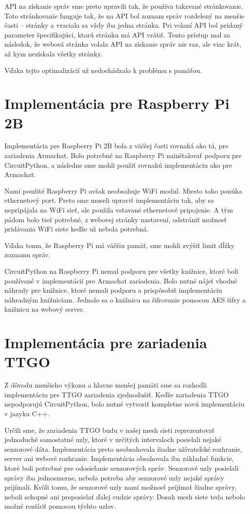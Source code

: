 \documentclass[slovak,master]{diploma}
\begin{document}
API na získanie správ sme preto upravili tak, že používa takzvané stránkovanie. Toto stránkovanie funguje tak, že na API bol zoznam správ rozdelený na menšie časti -- stránky a 
vraciala sa vždy iba jedna stránka. Pri volaní API bol pridaný parameter špecifikujúci, ktorú stránku má API vrátiť. Tento prístup mal za následok, že 
webová stránka volala API na získanie správ nie raz, ale viac krát, až kym nezískala všetky stránky.

Vďaka tejto optimalizácií už nedochádzalo k problému s pamäťou.

\section{Implementácia pre Raspberry Pi 2B}
Implementácia pre Raspberry Pi 2B bola z väčšej časti rovnaká ako tá, pre zariadenia Armachat. Bolo potrebné na Raspberry Pi nainštalovať podporu pre 
CircuitPython, a následne sme mohli použiť rovnakú implementáciu ako pre Armachat.

Nami použité Raspberry Pi avšak neobsahuje WiFi modul. Miesto toho ponúka ethernetový port. Preto sme museli upraviť implementáciu tak, 
aby sa nepripájala na WiFi sieť, ale použila vstavané ethernetové pripojenie. A tým pádom bolo tiež potrebné, z webovej stránky nastavení, odstrániť možnosť 
pridávania WiFi siete keďže už nebola potrebná.

Vďaka tomu, že Raspberry Pi má väčšiu pamäť, sme mohli zvýšiť limit dĺžky zoznamu správ.

CircuitPython na Raspberry Pi nemal podporu pre všetky knižnice, ktoré boli používané v implementácií pre Armachat zariadenia. Bolo nutné nájsť vhodné náhrady pre 
knižnice, ktoré nemali podporu a prispôsobiť implementáciu náhradným knižniciam. Jednalo sa o knižnicu na šifrovanie pomocou AES šifry a knižnicu na webový server. 

\section{Implementácia pre zariadenia TTGO}
Z dôvodu menšieho výkonu a hlavne menšej pamäti sme sa rozhodli implementáciu pre TTGO zariadenia zjednodušiť. Keďže zariadenia TTGO nepodporujú 
CircuitPython, bolo nutné vytvoriť kompletne novú implementáciu v jazyku C++.

Určili sme, že zariadenia TTGO budu v našej mesh sieti reprezentovať jednoduché samostatné uzly, ktoré v určitých intervaloch posielali nejaké senzorové dáta. Implementácia preto 
neobsahovala žiadne užívateľské rozhranie, server ani webové rozhranie. Implementácia obsahovala iba základné funkcie, ktoré boli potrebné pre 
odosielanie senzorových správ. Senzorové uzly posielali správy iba jednosmerne, nebola potreba aby senzorové uzly nejaké správy prijímali. 
Kvôli tomu, že senzorové uzly nami možnosť prijímať žiadne správy, neboli schopné ani preposielať ďalej cudzie správy. Dosah mesh siete teda nebolo možné 
rozšíriť pomocou týchto uzlov.
\end{document}
